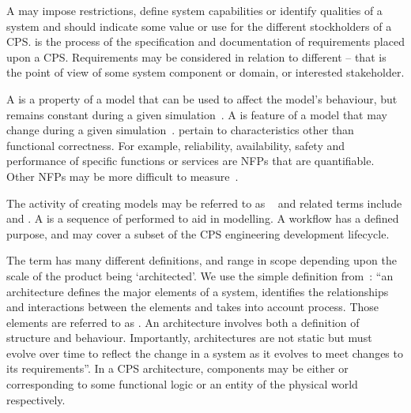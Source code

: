 A  may impose restrictions, define system capabilities or identify qualities of a system and should indicate some value or use for the different stockholders of a CPS.  is the process of the specification and documentation of requirements placed upon a CPS. Requirements may be considered in relation to different  -- that is the point of view of some system component or domain, or interested stakeholder.

A  is a property of a model that can be used to affect the model's behaviour, but remains constant during a given simulation~\cite{Broenink&12b}. A  is feature of a model that may change during a given simulation~\cite{Broenink&12b}.  pertain to characteristics other than functional correctness. For example, reliability, availability, safety and performance of specific functions or services are NFPs that are quantifiable. Other NFPs may be more difficult to measure~\cite{Payne&10}.

The activity of creating models may be referred to as  ~\cite{Fitzgerald&14c} and related terms include  and . A  is a sequence of  performed to aid in modelling. A workflow has a defined purpose, and may cover a subset of the CPS engineering development lifecycle.

The term  has many different definitions, and range in scope depending upon the scale of the product being `architected'. We use the simple definition from~\cite{COMPASSD22.6}:  ``an architecture defines the major elements of a system, identifies the relationships and interactions between the elements and takes into account process. Those elements are referred to as . An architecture involves both a definition of structure and behaviour. Importantly, architectures are not static but must evolve over time to reflect the change in a system as it evolves to meet changes to its requirements''. In a CPS architecture, components may be either  or  corresponding to some functional logic or an entity of the physical world respectively.

